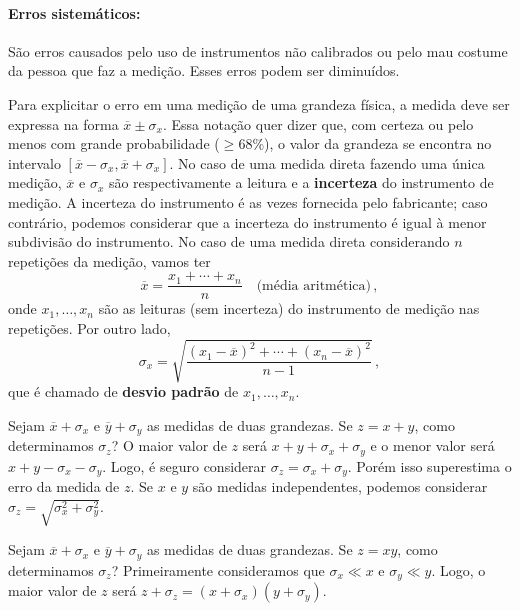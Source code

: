 \documentclass[12pt, a4paper]{article}
\begin{document}
\paragraph{Erros sistemáticos:} São erros causados pelo uso de instrumentos não calibrados ou pelo mau costume da pessoa que faz a medição. Esses erros podem ser diminuídos.

Para explicitar o erro em uma medição de uma grandeza física, a medida deve ser expressa na forma $\overline{x}\pm \sigma_x$. Essa notação quer dizer que, com certeza ou pelo menos com grande probabilidade ($\ge 68\%$), o valor da grandeza se encontra no intervalo $[\overline{x}-\sigma_x, \overline{x}+\sigma_x]$. No caso de uma medida direta fazendo uma única medição, $\overline{x}$ e $\sigma_x$ são respectivamente a leitura e a \textbf{incerteza} do instrumento de medição. A incerteza do instrumento é as vezes fornecida pelo fabricante; caso contrário, podemos considerar que a incerteza do instrumento é igual à menor subdivisão do instrumento. No caso de uma medida direta considerando $n$ repetições da medição, vamos ter 
$$\overline{x}=\frac{x_1+\cdots+x_n}{n}\quad\text{(média aritmética)}\,,$$
onde $x_1,\ldots,x_n$ são as leituras (sem incerteza) do instrumento de medição nas repetições. Por outro lado,
$$\sigma_x=\sqrt{\frac{(x_1-\overline{x})^2+\cdots+(x_n-\overline{x})^2}{n-1}}\,,$$
que é chamado de \textbf{desvio padrão} de $x_1,\ldots,x_n$.

Sejam $\overline{x}+\sigma_x$ e $\overline{y}+\sigma_y$ as medidas de duas grandezas. Se $z=x+y$, como determinamos $\sigma_z$? O maior valor de $z$ será $x+y+\sigma_x+\sigma_y$ e o menor valor será $x+y-\sigma_x-\sigma_y$. Logo, é seguro considerar $\sigma_z=\sigma_x+\sigma_y$. Porém isso superestima o erro da medida de $z$. Se $x$ e $y$ são medidas independentes, podemos considerar $\sigma_z=\sqrt{\sigma_x^2+\sigma_y^2}$.

Sejam $\overline{x}+\sigma_x$ e $\overline{y}+\sigma_y$ as medidas de duas grandezas. Se $z=xy$, como determinamos $\sigma_z$? Primeiramente consideramos que $\sigma_x\ll x$ e $\sigma_y\ll y$. Logo, o maior valor de $z$ será $z+\sigma_z=(x+\sigma_x)(y+\sigma_y)$.
\end{document}
